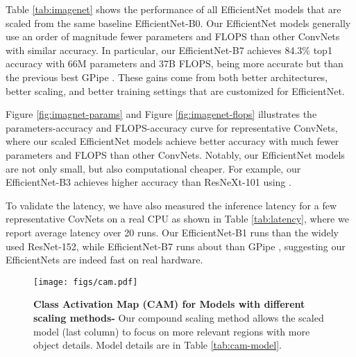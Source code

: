 \documentclass{article}
\begin{document}
Table \ref{tab:imagenet} shows the performance of all EfficientNet models that are scaled from the same baseline EfficientNet-B0. Our EfficientNet models generally use  an order of magnitude fewer parameters and FLOPS than other ConvNets with similar accuracy. In particular, our EfficientNet-B7 achieves 84.3\% top1 accuracy with 66M parameters and 37B FLOPS, being more accurate but  than the previous best GPipe \cite{gpipe18}.  These gains come from both better architectures, better scaling, and better training settings that are customized for EfficientNet.


Figure \ref{fig:imagnet-params} and Figure \ref{fig:imagenet-flops} illustrates the parameters-accuracy and FLOPS-accuracy curve for representative ConvNets, where our scaled EfficientNet models achieve better accuracy with much fewer parameters and FLOPS than other ConvNets. Notably, our EfficientNet models are not only small, but also computational cheaper. For example, our EfficientNet-B3 achieves higher accuracy than ResNeXt-101 \cite{resnext17} using .

To validate the latency, we have also measured the inference latency for a few representative CovNets on a real CPU as shown in Table \ref{tab:latency}, where we report average latency over 20 runs. Our EfficientNet-B1 runs   than the widely used ResNet-152, while EfficientNet-B7 runs about  than GPipe \cite{gpipe18}, suggesting our EfficientNets are indeed fast on real hardware.


\begin{figure*}                                                          
        \centering                                                                  
        \texttt{[image: figs/cam.pdf]} 
        \vskip -0.1in
        \caption{\textbf{Class Activation Map (CAM) \cite{cam16} for Models with different scaling methods-} Our compound scaling method allows the scaled model (last column) to focus on more relevant regions with more object details. Model details are in Table \ref{tab:cam-model}.
         }                                                                           
        \label{fig:cam}
         \vskip -0.15in  
\end{figure*} 
\end{document}
